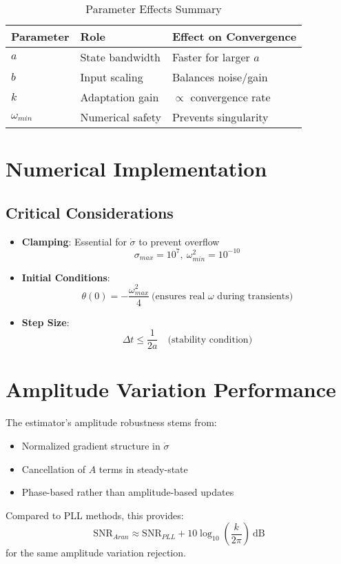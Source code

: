 \documentclass{article}
\begin{document}
\begin{table}[h]
\centering
\caption{Parameter Effects Summary}
\begin{tabular}{lll}
Parameter & Role & Effect on Convergence \\
\hline
$a$ & State bandwidth & Faster for larger $a$ \\
$b$ & Input scaling & Balances noise/gain \\
$k$ & Adaptation gain & $\propto$ convergence rate \\
$\omega_{min}$ & Numerical safety & Prevents singularity \\
\end{tabular}
\end{table}

\section{Numerical Implementation}

\subsection{Critical Considerations}
\begin{itemize}
\item \textbf{Clamping}: Essential for $\dot{\sigma}$ to prevent overflow
\begin{equation}
\sigma_{max} = 10^7,\ \omega_{min}^2 = 10^{-10}
\end{equation}

\item \textbf{Initial Conditions}:
\begin{equation}
\theta(0) = -\frac{\omega_{max}^2}{4} \ \text{(ensures real $\omega$ during transients)}
\end{equation}

\item \textbf{Step Size}:
\begin{equation}
\Delta t \leq \frac{1}{2a} \quad \text{(stability condition)}
\end{equation}
\end{itemize}

\section{Amplitude Variation Performance}

The estimator's amplitude robustness stems from:
\begin{itemize}
\item Normalized gradient structure in $\dot{\sigma}$
\item Cancellation of $A$ terms in steady-state
\item Phase-based rather than amplitude-based updates
\end{itemize}

Compared to PLL methods, this provides:
\begin{equation}
\text{SNR}_{Aran} \approx \text{SNR}_{PLL} + 10\log_{10}\left(\frac{k}{2\pi}\right) \ \text{dB}
\end{equation}
for the same amplitude variation rejection.
\end{document}
